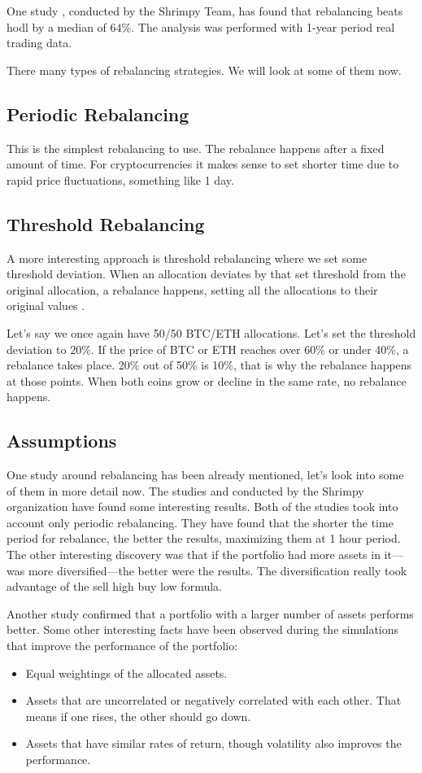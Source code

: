 One study \cite{portfolio-rebalancing}, conducted by the Shrimpy Team, has found that rebalancing beats hodl by a median of $64\%$. The analysis was performed with 1-year period real trading data.

There many types of rebalancing strategies. We will look at some of them now.

\subsection*{Periodic Rebalancing}
This is the simplest rebalancing to use. The rebalance happens after a fixed amount of time. For cryptocurrencies it makes sense to set shorter time due to rapid price fluctuations, something like 1 day.

\subsection*{Threshold Rebalancing}
A more interesting approach is threshold rebalancing where we set some threshold deviation. When an allocation deviates by that set threshold from the original allocation, a rebalance happens, setting all the allocations to their original values \cite{portfolio-rebalancing}.

Let's say we once again have 50/50 BTC/ETH allocations. Let's set the threshold deviation to $20\%$. If the price of BTC or ETH reaches over 60\% or under 40\%, a rebalance takes place. 20\% out of 50\% is 10\%, that is why the rebalance happens at those points. When both coins grow or decline in the same rate, no rebalance happens.

\subsection*{Assumptions}
One study around rebalancing has been already mentioned, let's look into some of them in more detail now. The studies \cite{portfolio-diversity} and \cite{diversify-perform-better} conducted by the Shrimpy organization have found some interesting results. Both of the studies took into account only periodic rebalancing. They have found that the shorter the time period for rebalance, the better the results, maximizing them at 1 hour period. The other interesting discovery was that if the portfolio had more assets in it---was more diversified---the better were the results. The diversification really took advantage of the sell high buy low formula.

Another study \cite{rebalancing-strategy} confirmed that a portfolio with a larger number of assets performs better. Some other interesting facts have been observed during the simulations that improve the performance of the portfolio:
\begin{itemize}
    \item Equal weightings of the allocated assets.
    \item Assets that are uncorrelated or negatively correlated with each other. That means if one rises, the other should go down. 
    \item Assets that have similar rates of return, though volatility also improves the performance.
\end{itemize}

